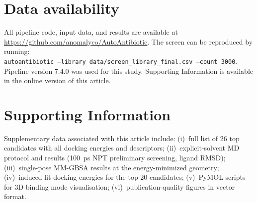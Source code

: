 \documentclass[12pt]{article}
\begin{document}
\section*{Data availability}
All pipeline code, input data, and results are available at \url{https://github.com/anomalyco/AutoAntibiotic}. The screen can be reproduced by running:\\[4pt]
\texttt{autoantibiotic --library data/screen\_library\_final.csv --count 3000}.\\[4pt]
Pipeline version 7.4.0 was used for this study. Supporting Information is available in the online version of this article.

\section*{Supporting Information}
Supplementary data associated with this article include: (i)~full list of 26 top candidates with all docking energies and descriptors; (ii)~explicit-solvent MD protocol and results (100~ps NPT preliminary screening, ligand RMSD); (iii)~single-pose MM-GBSA results at the energy-minimized geometry; (iv)~induced-fit docking energies for the top 20 candidates; (v)~PyMOL scripts for 3D binding mode visualisation; (vi)~publication-quality figures in vector format.



\end{document}
